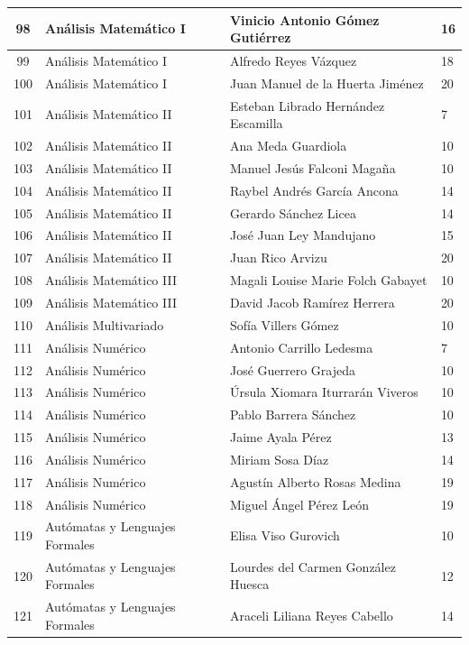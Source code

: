 {\begin{longtable}{|c|p{6.5cm}|p{5cm}|p{1.5cm}|}
  98 & Análisis Matemático I & Vinicio Antonio Gómez Gutiérrez & 16 \\ \hline
  99 & Análisis Matemático I & Alfredo Reyes Vázquez & 18 \\ \hline
  100 & Análisis Matemático I & Juan Manuel de la Huerta Jiménez & 20 \\ \hline
  101 & Análisis Matemático II & Esteban Librado Hernández Escamilla & 7 \\ \hline
  102 & Análisis Matemático II & Ana Meda Guardiola & 10 \\ \hline
  103 & Análisis Matemático II & Manuel Jesús Falconi Magaña & 10 \\ \hline
  104 & Análisis Matemático II & Raybel Andrés García Ancona & 14 \\ \hline
  105 & Análisis Matemático II & Gerardo Sánchez Licea & 14 \\ \hline
  106 & Análisis Matemático II & José Juan Ley Mandujano & 15 \\ \hline
  107 & Análisis Matemático II & Juan Rico Arvizu & 20 \\ \hline
  108 & Análisis Matemático III & Magali Louise Marie Folch Gabayet & 10 \\ \hline
  109 & Análisis Matemático III & David Jacob Ramírez Herrera & 20 \\ \hline
  110 & Análisis Multivariado & Sofía Villers Gómez & 10 \\ \hline
  111 & Análisis Numérico & Antonio Carrillo Ledesma & 7 \\ \hline
  112 & Análisis Numérico & José Guerrero Grajeda & 10 \\ \hline
  113 & Análisis Numérico & Úrsula Xiomara Iturrarán Viveros & 10 \\ \hline
  114 & Análisis Numérico & Pablo Barrera Sánchez & 10 \\ \hline
  115 & Análisis Numérico & Jaime Ayala Pérez & 13 \\ \hline
  116 & Análisis Numérico & Miriam Sosa Díaz & 14 \\ \hline
  117 & Análisis Numérico & Agustín Alberto Rosas Medina & 19 \\ \hline
  118 & Análisis Numérico & Miguel Ángel Pérez León & 19 \\ \hline
  119 & Autómatas y Lenguajes Formales & Elisa Viso Gurovich & 10 \\ \hline
  120 & Autómatas y Lenguajes Formales & Lourdes del Carmen González Huesca & 12 \\ \hline
  121 & Autómatas y Lenguajes Formales & Araceli Liliana Reyes Cabello & 14 \\ \hline

\end{longtable}}
